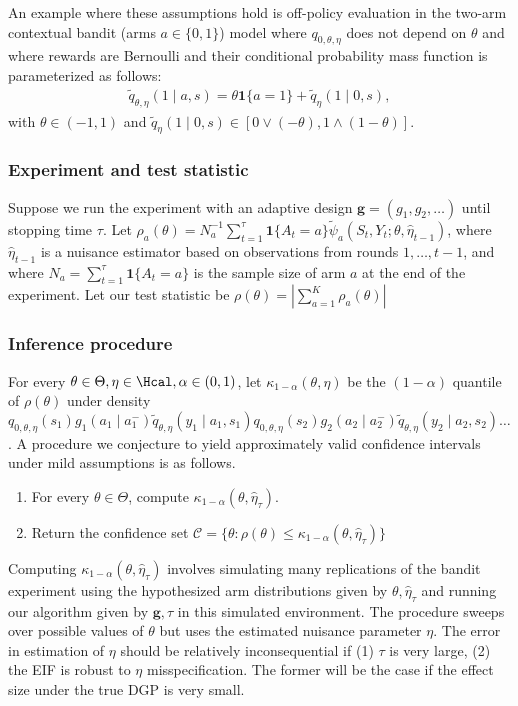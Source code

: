 An example where these assumptions hold is off-policy evaluation in the two-arm contextual bandit (arms $a \in \{0,1\}$) model where $q_{0, \theta, \eta}$ does not depend on $\theta$ and where rewards are Bernoulli and their conditional probability mass function is parameterized as follows:
\begin{align}
    \widetilde q_{\theta, \eta}(1 \mid a, s) = \theta \bm{1}\{a=1\} + \widetilde q_{\eta}(1 \mid 0, s),
\end{align}
with $\theta \in (-1,1)$ and $\widetilde q_{\eta}(1 \mid 0, s) \in [0\vee(-\theta), 1 \wedge(1 - \theta)]$.

\subsubsection{Experiment and test statistic} Suppose we run the experiment with an adaptive design $\bm{g}=(g_1,g_2,\ldots)$ until stopping time $\tau$.
Let $\rho_a(\theta) = N_a^{-1} \sum_{t=1}^\tau  \bm{1}\{A_t = a\}\widetilde \psi_a(S_t, Y_t ; \theta, \widehat{\eta}_{t-1})$, where $\widehat{\eta}_{t-1}$ is a nuisance estimator based on observations from rounds $1,\ldots, t-1$, and where $N_a = \sum_{t=1}^\tau \bm{1}\{ A_t = a\}$ is the sample size of arm $a$ at the end of the experiment. Let our test statistic be $\rho(\theta) = \left\lvert \sum_{a=1}^K \rho_a(\theta) \right\rvert$

\subsubsection{Inference procedure}  For every $\theta \in \Theta, \eta \in \Hcal, \alpha \in (0,1)$, let $\kappa_{1-\alpha}(\theta, \eta)$ be the $(1-\alpha)$ quantile of $\rho(\theta)$ under density $q_{0,\theta, \eta}(s_1)g_1(a_1 \mid a_1^-) \widetilde q_{\theta, \eta}(y_1 \mid a_1, s_1) q_{0,\theta, \eta}(s_2)g_2(a_2 \mid a_2^-) \widetilde q_{\theta, \eta}(y_2 \mid a_2, s_2) \ldots$. A procedure we conjecture to yield approximately valid confidence intervals under mild assumptions is as follows.
\begin{enumerate}
    \item For every $\theta \in \Theta$, compute $\kappa_{1-\alpha}(\theta, \widehat{\eta}_{\tau})$. 
    \item Return the confidence set $\mathcal{C} = \{ \theta : \rho(\theta) \leq  \kappa_{1-\alpha}(\theta, \widehat{\eta}_{\tau})\}$
\end{enumerate}
Computing $\kappa_{1-\alpha}(\theta, \widehat{\eta}_{\tau})$ involves simulating many replications of the bandit experiment using the hypothesized arm distributions given by $\theta, \widehat{\eta}_{\tau}$ and running our algorithm given by $\bm g,\tau$ in this simulated environment.
The procedure sweeps over possible values of $\theta$ but uses the estimated nuisance parameter $\eta$. The error in estimation of $\eta$ should be relatively inconsequential if (1) $\tau$ is very large, (2) the EIF is robust to $\eta$ misspecification. The former will be the case if the effect size under the true DGP is very small.

